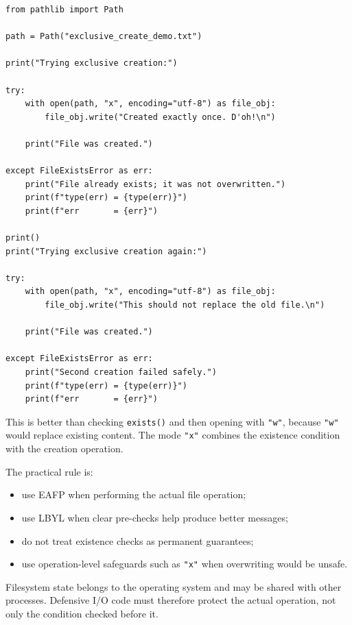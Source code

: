 \begin{verbatim}
from pathlib import Path

path = Path("exclusive_create_demo.txt")

print("Trying exclusive creation:")

try:
    with open(path, "x", encoding="utf-8") as file_obj:
        file_obj.write("Created exactly once. D'oh!\n")

    print("File was created.")

except FileExistsError as err:
    print("File already exists; it was not overwritten.")
    print(f"type(err) = {type(err)}")
    print(f"err       = {err}")

print()
print("Trying exclusive creation again:")

try:
    with open(path, "x", encoding="utf-8") as file_obj:
        file_obj.write("This should not replace the old file.\n")

    print("File was created.")

except FileExistsError as err:
    print("Second creation failed safely.")
    print(f"type(err) = {type(err)}")
    print(f"err       = {err}")
\end{verbatim}

This is better than checking \texttt{exists()} and then opening with \texttt{"w"}, because \texttt{"w"} would replace existing content. The mode \texttt{"x"} combines the existence condition with the creation operation.

The practical rule is:

\begin{itemize}
    \item use EAFP when performing the actual file operation;
    \item use LBYL when clear pre-checks help produce better messages;
    \item do not treat existence checks as permanent guarantees;
    \item use operation-level safeguards such as \texttt{"x"} when overwriting would be unsafe.
\end{itemize}

Filesystem state belongs to the operating system and may be shared with other processes. Defensive I/O code must therefore protect the actual operation, not only the condition checked before it.